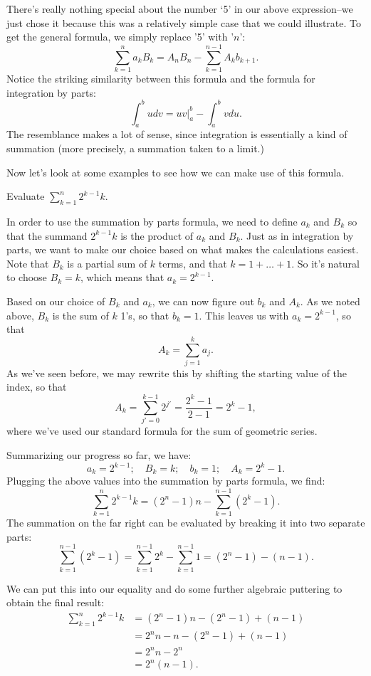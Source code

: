 There's really nothing special about the number `5' in our above expression--we just chose it because 
this was a relatively simple case that we could illustrate. To get the general formula, we simply replace '5' with '$n$':
\[\sum_{k=1}^{n}a_{k}B_{k}= A_{n}B_{n}-\sum_{k=1}^{n-1}A_{k}b_{k+1}. \]
Notice the striking similarity between this formula and the formula for integration by parts:
\[ \int_a^b u dv =\left. uv\right|_a^b - \int_a^b v du. \] 
The resemblance makes a lot of sense, since integration is essentially a kind of summation (more precisely,
a summation taken to a limit.)

Now let's look at some examples to see how we can make use of this formula.

\begin{example}{} Evaluate $\sum_{k=1}^{n}2^{k-1}k$.
 
In order to use the summation by parts formula, we need to define $a_k$ and $B_k$ so that the summand $2^{k-1}k$ is the product of $a_k$ and $B_k$. Just as in integration by parts, we want to make our choice based on what makes the calculations easiest. 
Note that $B_{k}$  is a partial sum of $k$ terms, and that $k = 1 + \ldots + 1$. So it's natural to choose $B_{k}=k$, which means that $a_{k}=2^{k-1}$.
 
Based on our choice of $B_{k}$ and  $a_{k}$, we can now figure out $b_{k}$ and $A_{k}$.  As we noted above, $B_{k}$ is the sum of $k$ 1's, so that $b_k=1$. This leaves us with $a_k = 2^{k-1}$, so that 
\[A_{k}=\sum_{j=1}^{k}a_j.\]
 As we've seen before, we may rewrite this by shifting the starting value of the index, so that 
\[A_{k}=\sum_{j'=0}^{k-1}2^{j'} =  \frac{2^k-1}{2-1} = 2^k-1,\]
where we've used our standard formula for the sum of geometric series.

Summarizing our progress so far, we have:
\[ a_k=2^{k-1};\quad B_k=k;\quad  b_k=1; \quad A_k=2^k-1. \]
Plugging the above values into the summation by parts formula, we find:
\[ \sum_{k=1}^{n}2^{k-1}k= \left (2 ^{n}-1 \right )n-\sum_{k=1}^{n-1}\left ( 2^{k}-1 \right ). \]
The summation on the far right can be evaluated by breaking it into two separate parts:
\[ \sum_{k=1}^{n-1}\left ( 2^{k}-1 \right )= \sum_{k=1}^{n-1}2^{k}-\sum_{k=1}^{n-1}1 = (2^{n}-1)- (n-1).\]
\end{example}
We can put this into our equality and do some further algebraic puttering to obtain the final result:
\begin{align*}
\sum_{k=1}^{n}2^{k-1}k &= (2 ^{n}-1)n- (2^{n}-1)+(n-1)\\
&=  2^{n}n-n-(2^{n}-1)+(n-1)\\
&=  2^{n}n-2^{n}\\
&=  2^{n}(n-1).
\end{align*}	


